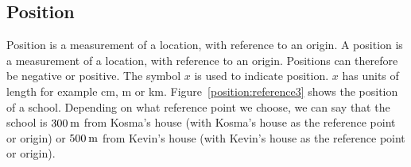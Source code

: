             \subsection*{Position}
            \nopagebreak
{} { Position is a measurement of a location, with reference to an origin.  } 
        \label{m38787*id62737}A position is a measurement of a location, with reference to an origin. Positions can therefore be negative or positive. The symbol $x$ is used to indicate position. $x$ has units of length for example cm, m or km.
Figure~\ref{position:reference3} shows the position of a school. Depending on what reference point we choose, we can say that the school is $300\phantom{\rule{2pt}{0ex}}\text{m}$ from Kosma's house (with Kosma's house as the reference point or origin) or  $500\phantom{\rule{2pt}{0ex}}\text{m}$ from Kevin's house (with Kevin's house as the reference point or origin).\par 
    \setcounter{subfigure}{0}
